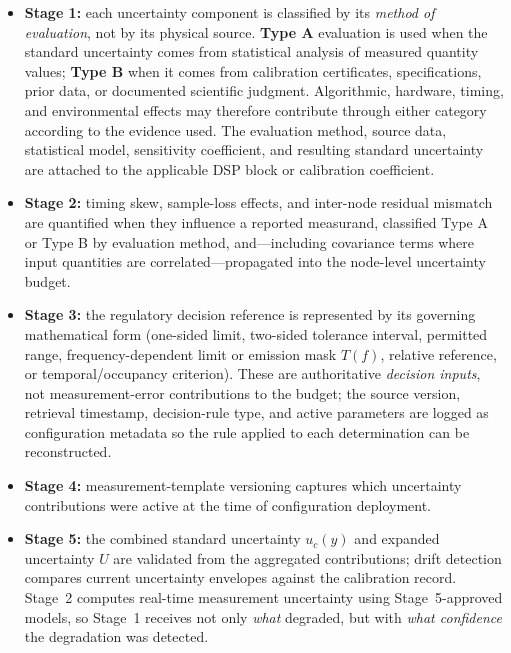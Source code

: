 \documentclass[11pt,a4paper]{article}
\begin{document}
\begin{itemize}
  \item \textbf{Stage 1:} each uncertainty component is classified by its \emph{method of
    evaluation}, not by its physical source. \textbf{Type A} evaluation is used when the standard
    uncertainty comes from statistical analysis of measured quantity values; \textbf{Type B} when
    it comes from calibration certificates, specifications, prior data, or documented scientific
    judgment. Algorithmic, hardware, timing, and environmental effects may therefore contribute
    through either category according to the evidence used. The evaluation method, source data,
    statistical model, sensitivity coefficient, and resulting standard uncertainty are attached
    to the applicable DSP block or calibration coefficient.
  \item \textbf{Stage 2:} timing skew, sample-loss effects, and inter-node residual mismatch are
    quantified when they influence a reported measurand, classified Type A or Type B by
    evaluation method, and---including covariance terms where input quantities are
    correlated---propagated into the node-level uncertainty budget.
  \item \textbf{Stage 3:} the regulatory decision reference is represented by its governing
    mathematical form (one-sided limit, two-sided tolerance interval, permitted range,
    frequency-dependent limit or emission mask $T(f)$, relative reference, or temporal/occupancy
    criterion). These are authoritative \emph{decision inputs}, not measurement-error
    contributions to the budget; the source version, retrieval timestamp, decision-rule type, and
    active parameters are logged as configuration metadata so the rule applied to each
    determination can be reconstructed.
  \item \textbf{Stage 4:} measurement-template versioning captures which uncertainty
    contributions were active at the time of configuration deployment.
  \item \textbf{Stage 5:} the combined standard uncertainty $u_c(y)$ and expanded uncertainty $U$
    are validated from the aggregated contributions; drift detection compares current uncertainty
    envelopes against the calibration record. Stage~2 computes real-time measurement uncertainty
    using Stage~5-approved models, so Stage~1 receives not only \emph{what} degraded, but with
    \emph{what confidence} the degradation was detected.
\end{itemize}
\end{document}
